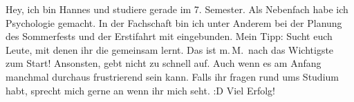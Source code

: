 \begin{multicols}{2}


{
Hey, ich bin Hannes und studiere gerade im 7. Semester. Als Nebenfach habe ich Psychologie gemacht. In der Fachschaft bin ich unter Anderem bei der Planung des Sommerfests und der Erstifahrt mit eingebunden. Mein Tipp: Sucht euch Leute, mit denen ihr die gemeinsam lernt. Das ist m.\,M.\ nach das Wichtigste zum Start! Ansonsten, gebt nicht zu schnell auf. Auch wenn es am Anfang manchmal durchaus frustrierend sein kann.
Falls ihr fragen rund ums Studium habt, sprecht mich gerne an wenn ihr mich seht. :D 
Viel Erfolg!
}

\vspace{-0.1cm}



\end{multicols}
